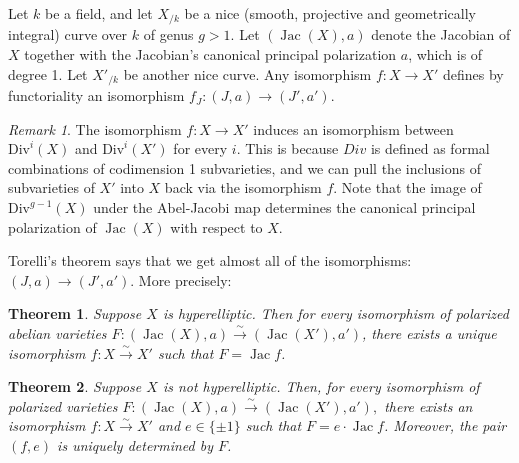 \documentclass[12pt,reqno]{amsart}
\DeclareMathOperator{\Jac}{Jac}
\newtheorem*{thm*}{Theorem}
\theoremstyle{definition}
\theoremstyle{remark}
\newtheorem*{remark}{Remark}
\begin{document}
Let $k$ be a field, and let $X_{/k}$ be a nice (smooth, projective and geometrically integral) curve over $k$ of genus $g > 1$.  Let $(\operatorname{Jac}(X),a)$ denote the Jacobian of $X$ together with the Jacobian's canonical principal polarization $a$, which is of degree 1.  Let $X'_{/k}$ be another nice curve. Any isomorphism $f: X \to X'$ defines by functoriality an isomorphism $f_J: (J, a) \to (J', a')$. 

\begin{remark} The isomorphism $f: X \to X'$ induces an isomorphism between $\text{Div}^i(X)$ and $\text{Div}^i(X')$ for every $i$. This is because $Div$ is defined as formal combinations of codimension 1 subvarieties, and we can pull the inclusions of subvarieties of $X'$ into $X$ back via the isomorphism $f$. Note that the image of $\text{Div}^{g-1}(X)$ under the Abel-Jacobi map determines the canonical principal polarization of $\Jac(X)$ with respect to $X$. \end{remark}



 


Torelli's theorem says that we get almost all of the isomorphisms: $(J, a) \to (J', a')$. More precisely:

\begin{thm*} Suppose $X$ is hyperelliptic.  Then for every isomorphism of polarized abelian varieties $F: (\operatorname{Jac}(X),a) \stackrel{\sim}{\rightarrow} (\operatorname{Jac}(X'),a')$, there exists a unique isomorphism $f: X \stackrel{\sim}{\rightarrow} X'$ such that $F = \operatorname{Jac} f$.  \end{thm*}

\begin{thm*} Suppose $X$ is not hyperelliptic.  Then, for every isomorphism of polarized varieties $F: (\operatorname{Jac}(X),a) \stackrel{\sim}{\rightarrow} (\operatorname{Jac}(X'),a'),$ there exists an isomorphism $f: X \stackrel{\sim}{\rightarrow} X'$ and $e \in \{ \pm 1\}$ such that $F = e \cdot  \operatorname{Jac} f$.  Moreover, the pair $(f,e)$ is uniquely determined by $F$. \end{thm*}
\end{document}
